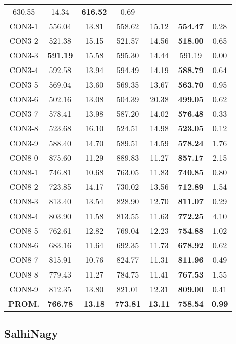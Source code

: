 \begin{table}[h]
\begin{tabular}{c c c c c c c}
630.55 & 14.34 & \bf{616.52} & 
0.69\\CON3-1 & 556.04 & 13.81 & 
558.62 & 15.12 & \bf{554.47} & 
0.28\\CON3-2 & 521.38 & 15.15 & 
521.57 & 14.56 & \bf{518.00} & 
0.65\\CON3-3 & \bf{591.19} & 15.58 & 
595.30 & 14.44 & 591.19 & 0.00\\
CON3-4 & 592.58 & 13.94 & 
594.49 & 14.19 & \bf{588.79} & 
0.64\\CON3-5 & 569.04 & 13.60 & 
569.35 & 13.67 & \bf{563.70} & 
0.95\\CON3-6 & 502.16 & 13.08 & 
504.39 & 20.38 & \bf{499.05} & 
0.62\\CON3-7 & 578.41 & 13.98 & 
587.20 & 14.02 & \bf{576.48} & 
0.33\\CON3-8 & 523.68 & 16.10 & 
524.51 & 14.98 & \bf{523.05} & 
0.12\\CON3-9 & 588.40 & 14.70 & 
589.51 & 14.59 & \bf{578.24} & 
1.76\\CON8-0 & 875.60 & 11.29 & 
889.83 & 11.27 & \bf{857.17} & 
2.15\\CON8-1 & 746.81 & 10.68 & 
763.05 & 11.83 & \bf{740.85} & 
0.80\\CON8-2 & 723.85 & 14.17 & 
730.02 & 13.56 & \bf{712.89} & 
1.54\\CON8-3 & 813.40 & 13.54 & 
828.90 & 12.70 & \bf{811.07} & 
0.29\\CON8-4 & 803.90 & 11.58 & 
813.55 & 11.63 & \bf{772.25} & 
4.10\\CON8-5 & 762.61 & 12.82 & 
769.04 & 12.23 & \bf{754.88} & 
1.02\\CON8-6 & 683.16 & 11.64 & 
692.35 & 11.73 & \bf{678.92} & 
0.62\\CON8-7 & 815.91 & 10.76 & 
824.77 & 11.31 & \bf{811.96} & 
0.49\\CON8-8 & 779.43 & 11.27 & 
784.75 & 11.41 & \bf{767.53} & 
1.55\\CON8-9 & 812.35 & 13.80 & 
821.01 & 12.31 & \bf{809.00} & 
0.41\\\bf{PROM.} & 
\bf{766.78} & \bf{13.18} & \bf{773.81} & \bf{13.11} & \bf{758.54} & \bf{0.99}\\[1ex]\hline
\end{tabular}
\label{table:ILS-VND-M-55-70}
\end{table}

\clearpage
\subsection{SalhiNagy}

